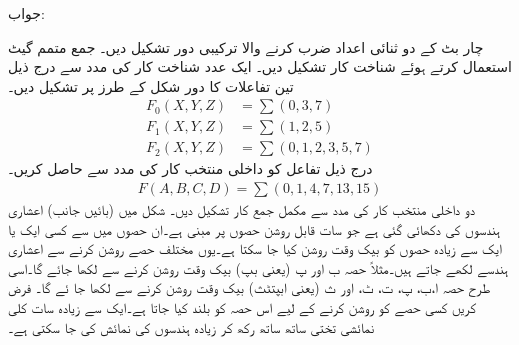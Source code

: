  جواب:
 \begin{center}
 \end{center}
 چار بٹ کے دو ثنائی اعداد ضرب کرنے والا ترکیبی دور تشکیل دیں۔
 جمع متمم گیٹ استعمال کرتے ہوئے  شناخت کار تشکیل دیں۔
ایک عدد   شناخت کار کی مدد سے   درج ذیل تین تفاعلات  کا دور  شکل   کے طرز پر تشکیل دیں۔
\begin{align*}
F_0(X,Y,Z)&=\sum(0,3,7)\\
F_1(X,Y,Z)&=\sum(1,2,5)\\
F_2(X,Y,Z)&=\sum(0,1,2,3,5,7)
\end{align*}
 درج ذیل تفاعل کو   داخلی منتخب کار کی مدد سے حاصل  کریں۔
 \begin{align*}
 F(A,B,C,D)=\sum(0,1,4,7,13,15)
 \end{align*}
 دو داخلی منتخب کار کی مدد سے  مکمل جمع کار  تشکیل دیں۔
 شکل   میں (بائیں جانب)  اعشاری ہندسوں کی   دکھائی  گئی ہے جو سات قابل روشن حصوں پر مبنی ہے۔ان حصوں میں سے  کسی ایک یا ایک سے زیادہ حصوں کو بیک وقت روشن کیا جا سکتا  ہے۔یوں مختلف حصے روشن کرنے سے اعشاری ہندسے لکھے  جاتے ہیں۔مثلاً   حصہ ب اور پ  (یعنی بپ)  بیک وقت روشن کرنے سے    لکھا جائے گا۔اسی طرح حصہ ا،ب،  پ، ت، ٹ، اور  ث (یعنی ابپتٹث)   بیک  وقت روشن کرنے سے  لکھا جا ئے گا۔   فرض کریں کسی حصے کو  روشن کرنے کے لیے اس حصہ  کو  بلند کیا جاتا ہے۔ایک سے زیادہ سات کلی نمائشی تختی ساتھ ساتھ رکھ کر زیادہ ہندسوں کی نمائش کی جا سکتی ہے۔
 
